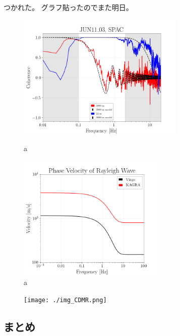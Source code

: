 \documentclass[a4paper,12pt]{jsarticle}
\begin{document}
つかれた。
グラフ貼ったのでまた明日。

\begin{figure}[H]
 \begin{minipage}{0.5\hsize}
  \begin{center}
    \includegraphics[width=8.0cm]{./img_coherence_result.png}    
  \end{center}
  \caption{a}
  \label{img:img_coherence_result}  
 \end{minipage}
 \begin{minipage}{0.5\hsize}
  \begin{center}
    \includegraphics[width=7.0cm]{./img_RwaveVelocity.png}    
  \end{center}
  \caption{a}
  \label{img:img_RwaveVelocity}  
 \end{minipage}
\end{figure}

\begin{figure}[H]
  \begin{center}
    \texttt{[image: ./img\_CDMR.png]}
  \end{center}
  \caption{}
  \label{img:img_dmrr}
\end{figure}


\subsection{まとめ}

\appendix


\end{document}
